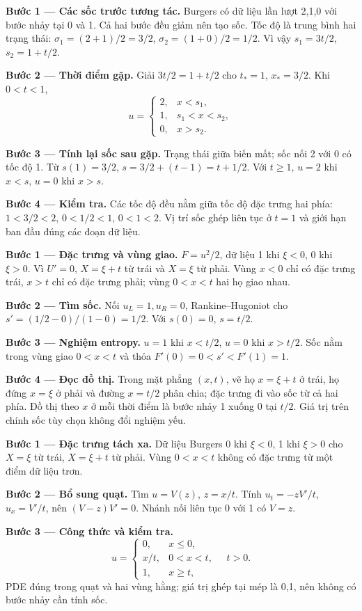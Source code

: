 \textbf{Bước 1 — Các sốc trước tương tác.} Burgers có dữ liệu lần lượt 2,1,0 với bước nhảy tại 0 và 1. Cả hai bước đều giảm nên tạo sốc. Tốc độ là trung bình hai trạng thái: $\sigma_1=(2+1)/2=3/2$, $\sigma_2=(1+0)/2=1/2$. Vì vậy $s_1=3t/2$, $s_2=1+t/2$.

\textbf{Bước 2 — Thời điểm gặp.} Giải $3t/2=1+t/2$ cho $t_*=1$, $x_*=3/2$. Khi $0<t<1$,
\[u=\begin{cases}2,&x<s_1,\\1,&s_1<x<s_2,\\0,&x>s_2.\end{cases}\]

\textbf{Bước 3 — Tính lại sốc sau gặp.} Trạng thái giữa biến mất; sốc nối 2 với 0 có tốc độ 1. Từ $s(1)=3/2$, $s=3/2+(t-1)=t+1/2$. Với $t\ge1$, $u=2$ khi $x<s$, $u=0$ khi $x>s$.

\textbf{Bước 4 — Kiểm tra.} Các tốc độ đều nằm giữa tốc độ đặc trưng hai phía: $1<3/2<2$, $0<1/2<1$, $0<1<2$. Vị trí sốc ghép liên tục ở $t=1$ và giới hạn ban đầu đúng các đoạn dữ liệu.

\textbf{Bước 1 — Đặc trưng và vùng giao.} $F=u^2/2$, dữ liệu 1 khi $\xi<0$, 0 khi $\xi>0$. Vì $U'=0$, $X=\xi+t$ từ trái và $X=\xi$ từ phải. Vùng $x<0$ chỉ có đặc trưng trái, $x>t$ chỉ có đặc trưng phải; vùng $0<x<t$ hai họ giao nhau.

\textbf{Bước 2 — Tìm sốc.} Nối $u_L=1,u_R=0$, Rankine–Hugoniot cho $s'=(1/2-0)/(1-0)=1/2$. Với $s(0)=0$, $s=t/2$.

\textbf{Bước 3 — Nghiệm entropy.} $u=1$ khi $x<t/2$, $u=0$ khi $x>t/2$. Sốc nằm trong vùng giao $0<x<t$ và thỏa $F'(0)=0<s'<F'(1)=1$.

\textbf{Bước 4 — Đọc đồ thị.} Trong mặt phẳng $(x,t)$, vẽ họ $x=\xi+t$ ở trái, họ đứng $x=\xi$ ở phải và đường $x=t/2$ phân chia; đặc trưng đi vào sốc từ cả hai phía. Đồ thị theo $x$ ở mỗi thời điểm là bước nhảy 1 xuống 0 tại $t/2$. Giá trị trên chính sốc tùy chọn không đổi nghiệm yếu.

\textbf{Bước 1 — Đặc trưng tách xa.} Dữ liệu Burgers 0 khi $\xi<0$, 1 khi $\xi>0$ cho $X=\xi$ từ trái, $X=\xi+t$ từ phải. Vùng $0<x<t$ không có đặc trưng từ một điểm dữ liệu trơn.

\textbf{Bước 2 — Bổ sung quạt.} Tìm $u=V(z)$, $z=x/t$. Tính $u_t=-zV'/t$, $u_x=V'/t$, nên $(V-z)V'=0$. Nhánh nối liên tục 0 với 1 có $V=z$.

\textbf{Bước 3 — Công thức và kiểm tra.}
\[u=\begin{cases}0,&x\le0,\\x/t,&0<x<t,\\1,&x\ge t,\end{cases}\quad t>0.\]
PDE đúng trong quạt và hai vùng hằng; giá trị ghép tại mép là 0,1, nên không có bước nhảy cần tính sốc.

